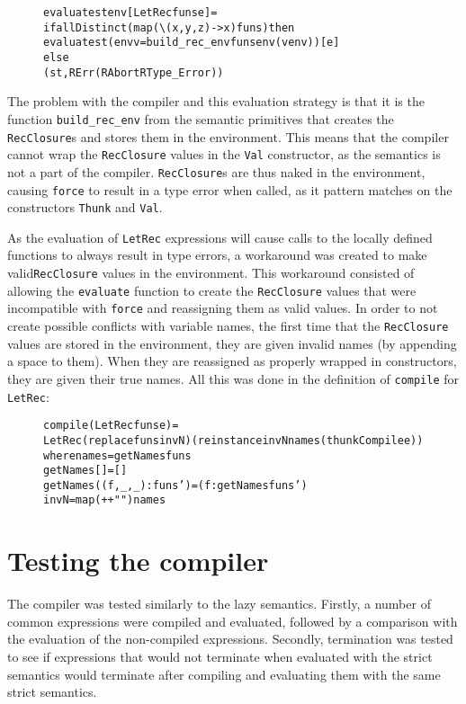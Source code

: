 \begin{figure}[H]
\begin{alltt}
  evaluate st env [LetRec funs e] =
    if allDistinct (map (\textbackslash(x,y,z) -> x) funs) then
      evaluate st (env {v = build_rec_env funs env (v env)}) [e]
    else
      (st, RErr (RAbort RType_Error))
\end{alltt}
\end{figure}

\noindent The problem with the compiler and this evaluation strategy is that it
is the function \texttt{build\_rec\_env} from the semantic primitives that
creates the \texttt{RecClosure}s and stores them in the environment. This means
that the compiler cannot wrap the \texttt{RecClosure} values in the
\texttt{Val} constructor, as the semantics is not a part of the compiler.
\texttt{RecClosure}s are thus naked in the environment, causing \texttt{force}
to result in a type error when called, as it pattern matches on the constructors
\texttt{Thunk} and \texttt{Val}.

As the evaluation of \texttt{LetRec} expressions will cause calls to the locally
defined functions to always result in type errors, a workaround was created to
make valid\texttt{RecClosure} values in the environment. This workaround
consisted of allowing the \texttt{evaluate} function to create the
\texttt{RecClosure} values that were incompatible with \texttt{force} and
reassigning them as valid values. In order to not create possible conflicts
with variable names, the first time that the \texttt{RecClosure} values are
stored in the environment, they are given invalid names (by appending a space
to them). When they are reassigned as properly wrapped in constructors, they
are given their true names. All this was done in the definition of
\texttt{compile} for \texttt{LetRec}:

\begin{figure}[H]
\begin{alltt}
  compile (LetRec funs e) =
    LetRec (replace funs invN) (reinstance invN names (thunkCompile e))
    where names = getNames funs
          getNames [] = []
          getNames ((f,_,_):funs') = (f:getNames funs')
          invN = map (++ " ") names
\end{alltt}
\end{figure}

\section{Testing the compiler}
The compiler was tested similarly to the lazy semantics. Firstly, a number of
common expressions were compiled and evaluated, followed by a comparison with
the evaluation of the non-compiled expressions. Secondly, termination was tested
to see if expressions that would not terminate when evaluated with the strict
semantics would terminate after compiling and evaluating them with the same
strict semantics.

